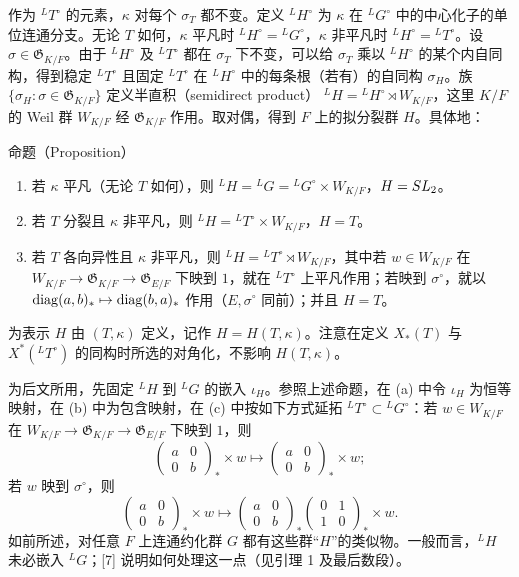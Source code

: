 作为 ${}^LT^\circ$ 的元素，$\kappa$ 对每个 $\sigma_T$ 都不变。定义 ${}^LH^\circ$ 为 $\kappa$ 在 ${}^LG^\circ$ 中的中心化子的单位连通分支。无论 $T$ 如何，$\kappa$ 平凡时 ${}^LH^\circ={}^LG^\circ$，$\kappa$ 非平凡时 ${}^LH^\circ={}^LT^\circ$。设 $\sigma\in\mathfrak G_{K/F}$。由于 ${}^LH^\circ$ 及 ${}^LT^\circ$ 都在 $\sigma_T$ 下不变，可以给 $\sigma_T$ 乘以 ${}^LH^\circ$ 的某个内自同构，得到稳定 ${}^LT^\circ$ 且固定 ${}^LT^\circ$ 在 ${}^LH^\circ$ 中的每条根（若有）的自同构 $\sigma_H$。族
$\{\sigma_H:\sigma\in\mathfrak G_{K/F}\}$ 定义半直积（semidirect product）
${}^LH={}^LH^\circ\rtimes W_{K/F}$，这里 $K/F$ 的 Weil 群 $W_{K/F}$ 经 $\mathfrak G_{K/F}$ 作用。取对偶，得到 $F$ 上的拟分裂群 $H$。具体地：

\begin{originaltheorem}{命题（Proposition）}
\begin{enumerate}
\item[(a)] 若 $\kappa$ 平凡（无论 $T$ 如何），则
${}^LH={}^LG={}^LG^\circ\times W_{K/F}$，$H=SL_2$。
\item[(b)] 若 $T$ 分裂且 $\kappa$ 非平凡，则
${}^LH={}^LT^\circ\times W_{K/F}$，$H=T$。
\item[(c)] 若 $T$ 各向异性且 $\kappa$ 非平凡，则
${}^LH={}^LT^\circ\rtimes W_{K/F}$，其中若 $w\in W_{K/F}$ 在
$W_{K/F}\to\mathfrak G_{K/F}\to\mathfrak G_{E/F}$ 下映到 $1$，就在 ${}^LT^\circ$ 上平凡作用；若映到 $\sigma^\circ$，就以
$\operatorname{diag}(a,b)_*\mapsto\operatorname{diag}(b,a)_*$ 作用（$E,\sigma^\circ$ 同前）；并且 $H=T$。
\end{enumerate}
\end{originaltheorem}

为表示 $H$ 由 $(T,\kappa)$ 定义，记作 $H=H(T,\kappa)$。注意在定义
$X_*(T)$ 与 $X^*({}^LT^\circ)$ 的同构时所选的对角化，不影响 $H(T,\kappa)$。

为后文所用，先固定 ${}^LH$ 到 ${}^LG$ 的嵌入 $\iota_H$。参照上述命题，在 (a) 中令 $\iota_H$ 为恒等映射，在 (b) 中为包含映射，在 (c) 中按如下方式延拓 ${}^LT^\circ\subset{}^LG^\circ$：若 $w\in W_{K/F}$ 在
$W_{K/F}\to\mathfrak G_{K/F}\to\mathfrak G_{E/F}$ 下映到 $1$，则
\[
\begin{pmatrix}a&0\\0&b\end{pmatrix}_*\times w
\longmapsto\begin{pmatrix}a&0\\0&b\end{pmatrix}_*\times w;
\]
若 $w$ 映到 $\sigma^\circ$，则
\[
\begin{pmatrix}a&0\\0&b\end{pmatrix}_*\times w
\longmapsto\begin{pmatrix}a&0\\0&b\end{pmatrix}_*
\begin{pmatrix}0&1\\1&0\end{pmatrix}_*\times w.
\]
如前所述，对任意 $F$ 上连通约化群 $G$ 都有这些群“$H$”的类似物。一般而言，${}^LH$ 未必嵌入 ${}^LG$；[7] 说明如何处理这一点（见引理 1 及最后数段）。

